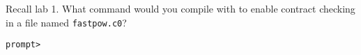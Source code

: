 
Recall lab 1.  What command would you compile with to enable contract
checking in a file named \lstinline'fastpow.c0'?

\bigskip

\lstinline'prompt> '

\begin{solutionFmt}
\clearpage
\end{solutionFmt}
